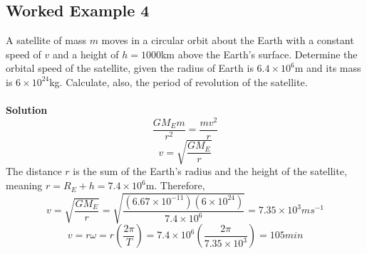 \documentclass{article}
\begin{document}
\subsection*{Worked Example 4}
A satellite of mass $m$ moves in a circular orbit about the Earth with a constant speed of $v$ and a height of $h=1000$km above the Earth's surface.
Determine the orbital speed of the satellite, given the radius of Earth is $6.4\times10^6$m and its mass is $6\times10^24$kg. Calculate, also, the period of revolution of the satellite.
\\
\\\textbf{Solution}
\begin{equation}
    \frac{GM_Em}{r^2}=\frac{mv^2}{r}
\end{equation}
\begin{equation}
    v=\sqrt{\frac{GM_E}{r}}
\end{equation}
The distance $r$ is the sum of the Earth's radius and the height of the satellite, meaning $r=R_E+h=7.4\times10^6$m. Therefore,
\begin{equation}
    v=\sqrt{\frac{GM_E}{r}}=\sqrt{\frac{(6.67\times10^{-11})(6\times10^{24})}{7.4\times10^6}}=7.35\times10^3ms^{-1}
\end{equation}
\begin{equation}
    v=r\omega=r(\frac{2\pi}{T})=7.4\times10^6(\frac{2\pi}{7.35\times10^3})=105min
\end{equation}
\end{document}

